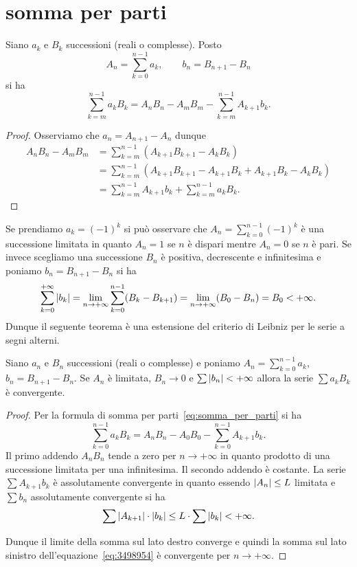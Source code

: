 \section{somma per parti}
\begin{theorem}
\label{th:somma_per_parti}%
Siano $a_k$ e $B_k$ successioni (reali o complesse).
Posto
\[
  A_n = \sum_{k=0}^{n-1} a_k, \qquad
  b_n = B_{n+1} - B_n
\]
si ha
%
%
\begin{equation}\label{eq:somma_per_parti}
 \sum_{k=m}^{n-1} a_k B_k = A_n B_n - A_m B_m - \sum_{k=m}^{n-1} A_{k+1}b_k.
\end{equation}
\end{theorem}
%
\begin{proof}
Osserviamo che $a_n = A_{n+1}-A_n$ dunque
\begin{align*}
  A_n B_n - A_m B_m
  &= \sum_{k=m}^{n-1} (A_{k+1}B_{k+1}-A_k B_k)\\
  &= \sum_{k=m}^{n-1} (A_{k+1}B_{k+1}-A_{k+1}B_k + A_{k+1}B_k - A_k B_k)\\
  &= \sum_{k=m}^{n-1} A_{k+1}b_k + \sum_{k=m}^{n-1} a_k B_k.
\end{align*}
\end{proof}

Se prendiamo $a_k=(-1)^k$ si può osservare che $A_n = \sum_{k=0}^{n-1} (-1)^k$
è una successione limitata in quanto $A_n = 1$ se $n$ è dispari mentre
$A_n=0$ se $n$ è pari.
Se invece scegliamo una successione $B_n$ è positiva,
decrescente e infinitesima
e poniamo $b_n = B_{n+1}-B_n$
si ha
\[
  \sum_{k=0}^{+\infty} {\left|b_k\right|}
  = \lim_{n\to+\infty}\sum_{k=0}^{n-1} (B_k-B_{k+1})
  = \lim_{n\to +\infty} (B_0 - B_n) = B_0 < +\infty.
\]
Dunque il seguente teorema è una estensione del criterio
di Leibniz per le serie a segni alterni.

\begin{theorem}%
\label{th:dirichlet}%
Siano $a_n$ e $B_n$ successioni (reali o complesse)
e poniamo $\displaystyle A_n = \sum_{k=0}^{n-1} a_k$,
$b_n = B_{n+1} - B_n$.
Se $A_n$ è limitata,
$B_n\to 0$
e $\sum {\left|b_n\right|} < +\infty$
allora la serie $\sum a_k B_k$ è convergente.
\end{theorem}
%
\begin{proof}
Per la formula di somma per parti~\eqref{eq:somma_per_parti}
 si ha
\begin{equation}\label{eq:3498954}
 \sum_{k=0}^{n-1} a_k B_k
 = A_n B_n - A_0 B_0 - \sum_{k=0}^{n-1} A_{k+1}b_k.
\end{equation}
Il primo addendo $A_n B_n$ tende a zero per $n\to +\infty$
in quanto prodotto di una successione limitata per una infinitesima.
Il secondo addendo è costante.
La serie $\sum A_{k+1} b_k$ è assolutamente convergente
in quanto essendo ${\left|A_n\right|}\le L$ limitata
e $\sum b_n$ assolutamente convergente si ha
\[
  \sum {\left|A_{k+1}\right|} \cdot {\left|b_k\right|}
  \le L \cdot \sum {\left|b_k\right|} < +\infty.
\]

Dunque il limite della somma sul lato destro converge e quindi
la somma sul lato sinistro
dell'equazione~\eqref{eq:3498954}
è convergente per $n\to +\infty$.
\end{proof}

